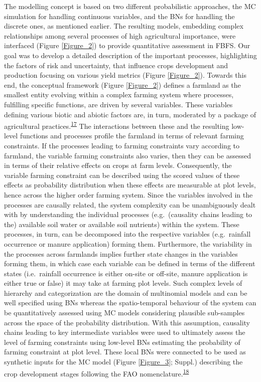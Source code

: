 \documentclass[11pt,preprint]{article}
\begin{document}
The modelling concept is based on two different probabilistic
approaches, the MC simulation for handling continuous variables, and the
BNs for handling the discrete ones, as mentioned earlier. The resulting
models, embedding complex relationships among several processes of high
agricultural importance, were interfaced (Figure \ref{Figure_2}) to
provide quantitative assessment in FBFS. Our goal was to develop a
detailed description of the important processes, highlighting the
factors of risk and uncertainty, that influence crops development and
production focusing on various yield metrics (Figure \ref{Figure_2}).
Towards this end, the conceptual framework (Figure \ref{Figure_2})
defines a farmland as the smallest entity evolving within a complex
farming system where processes, fulfilling specific functions, are
driven by several variables. These variables defining various biotic and
abiotic factors are, in turn, moderated by a package of agricultural
practices.\textsuperscript{\protect\hyperlink{ref-Jax_and_Setala_2005}{17}}
The interactions between these and the resulting low-level functions and
processes profile the farmland in terms of relevant farming constraints.
If the processes leading to farming constraints vary according to
farmland, the variable farming constraints also varies, then they can be
assessed in terms of their relative effects on crops at farm levels.
Consequently, the variable farming constraint can be described using the
scored values of these effects as probability distribution when these
effects are measurable at plot levels, hence across the higher order
farming system. Since the variables involved in the processes are
causally related, the system complexity can be unambiguously dealt with
by understanding the individual processes (e.g.~(causality chains
leading to the) available soil water or available soil nutrients) within
the system. These processes, in turn, can be decomposed into the
respective variables (e.g.~rainfall occurrence or manure application)
forming them. Furthermore, the variability in the processes across
farmlands implies further state changes in the variables forming them,
in which case each variable can be defined in terms of the different
states (i.e.~rainfall occurrence is either on-site or off-site, manure
application is either true or false) it may take at farming plot levels.
Such complex levels of hierarchy and categorization are the domain of
multinomial models and can be well specified using BNs whereas the
spatio-temporal behaviour of the system can be quantitatively assessed
using MC models considering plausible sub-samples across the space of
the probability distribution. With this assumption, causality chains
leading to key intermediate variables were used to ultimately assess the
level of farming constraints using low-level BNs estimating the
probability of farming constraint at plot level. These local BNs were
connected to be used as synthetic inputs for the MC model (Figure
\ref{Figure_3}; Suppl.) describing the crop development stages following
the FAO
nomenclature.\textsuperscript{\protect\hyperlink{ref-Allen_et_al_1998}{18}}
\end{document}
